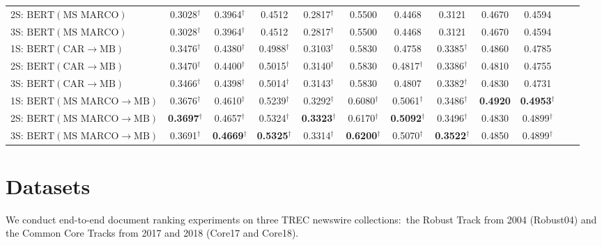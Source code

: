 \begin{sidewaystable*}[htbp]
\begin{center}
{\begin{tabular}{lcc ccc ccc ccc}
2S: $ \textrm{BERT}(\textrm{MS MARCO}) $ & 0.3028$^{\dagger}$ & 0.3964$^{\dagger}$ & 0.4512 & 0.2817$^{\dagger}$ & 0.5500 & 0.4468 & 0.3121 & 0.4670 & 0.4594 \\
3S: $ \textrm{BERT}(\textrm{MS MARCO}) $ & 0.3028$^{\dagger}$ & 0.3964$^{\dagger}$ & 0.4512 & 0.2817$^{\dagger}$ & 0.5500 & 0.4468 & 0.3121 & 0.4670 & 0.4594 \\
\midrule
1S: $ \textrm{BERT}(\textrm{CAR}\rightarrow\textrm{MB}) $ & 0.3476$^{\dagger}$ & 0.4380$^{\dagger}$ & 0.4988$^{\dagger}$ & 0.3103$^{\dagger}$ & 0.5830 & 0.4758 & 0.3385$^{\dagger}$ & 0.4860 & 0.4785 \\
2S: $ \textrm{BERT}(\textrm{CAR}\rightarrow\textrm{MB}) $ & 0.3470$^{\dagger}$ & 0.4400$^{\dagger}$ & 0.5015$^{\dagger}$ & 0.3140$^{\dagger}$ & 0.5830 & 0.4817$^{\dagger}$ & 0.3386$^{\dagger}$ & 0.4810 & 0.4755 \\
3S: $ \textrm{BERT}(\textrm{CAR}\rightarrow\textrm{MB}) $ & 0.3466$^{\dagger}$ & 0.4398$^{\dagger}$ & 0.5014$^{\dagger}$ & 0.3143$^{\dagger}$ & 0.5830 & 0.4807 & 0.3382$^{\dagger}$ & 0.4830 & 0.4731 \\
\midrule
1S: $ \textrm{BERT}(\textrm{MS MARCO}\rightarrow\textrm{MB}) $ & 0.3676$^{\dagger}$ & 0.4610$^{\dagger}$ & 0.5239$^{\dagger}$ & 0.3292$^{\dagger}$ & 0.6080$^{\dagger}$ & 0.5061$^{\dagger}$ & 0.3486$^{\dagger}$ & {\bf 0.4920} & {\bf 0.4953}$^{\dagger}$ \\
2S: $ \textrm{BERT}(\textrm{MS MARCO}\rightarrow\textrm{MB}) $ & {\bf 0.3697}$^{\dagger}$ & 0.4657$^{\dagger}$ & 0.5324$^{\dagger}$ & {\bf 0.3323}$^{\dagger}$ & 0.6170$^{\dagger}$ & {\bf 0.5092}$^{\dagger}$ & 0.3496$^{\dagger}$ & 0.4830 & 0.4899$^{\dagger}$ \\
3S: $ \textrm{BERT}(\textrm{MS MARCO}\rightarrow\textrm{MB}) $ & 0.3691$^{\dagger}$ & {\bf 0.4669}$^{\dagger}$ & {\bf 0.5325}$^{\dagger}$ & 0.3314$^{\dagger}$ & {\bf 0.6200}$^{\dagger}$ & 0.5070$^{\dagger}$ & {\bf 0.3522}$^{\dagger}$ & 0.4850 & 0.4899$^{\dagger}$ \\
\bottomrule
\end{tabular}
}
\label{tab:results}
\end{center}
\end{sidewaystable*}

\section{Datasets}

We conduct end-to-end document ranking experiments on three TREC newswire collections:\
the Robust Track from 2004 (Robust04) and the Common Core Tracks from 2017 and 2018 (Core17 and Core18).

